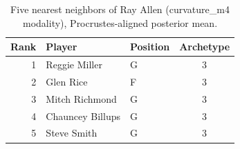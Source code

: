 \begin{table}[htbp]
  \centering\small
  \begin{tabular}{rllc}
    \toprule
    Rank & Player & Position & Archetype \\
    \midrule
    1 & Reggie Miller & G & 3 \\
    2 & Glen Rice & F & 3 \\
    3 & Mitch Richmond & G & 3 \\
    4 & Chauncey Billups & G & 3 \\
    5 & Steve Smith & G & 3 \\
    \bottomrule
  \end{tabular}
  \caption{Five nearest neighbors of Ray Allen (curvature_m4 modality), Procrustes-aligned posterior mean.}
  \label{tab:Ray_Allen_neighbors_curvature_m4}
\end{table}

